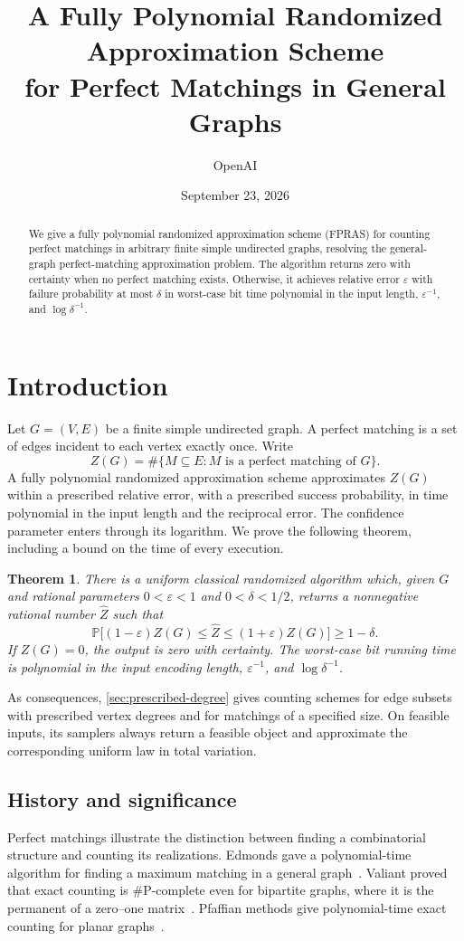 \documentclass[11pt]{article}
\title{A Fully Polynomial Randomized Approximation Scheme\\
for Perfect Matchings in General Graphs}
\author{OpenAI}
\date{September 23, 2026}
\newtheorem{theorem}{Theorem}[section]
\theoremstyle{definition}
\theoremstyle{remark}
\newcommand{\Prb}{\mathbb P}
\newcommand{\eps}{\varepsilon}
\numberwithin{equation}{section}
\begin{document}
\maketitle
\begin{abstract}
We give a fully polynomial randomized approximation scheme (FPRAS) for
counting perfect matchings in arbitrary finite simple undirected graphs,
resolving the general-graph perfect-matching approximation problem.
The algorithm returns zero with certainty when no perfect matching exists.
Otherwise, it achieves relative error $\eps$ with failure probability at
most $\delta$ in worst-case bit time polynomial in the input length,
$\eps^{-1}$, and $\log\delta^{-1}$.
\end{abstract}
\tableofcontents
\section{Introduction}
\label{sec:introduction}

Let $G=(V,E)$ be a finite simple undirected graph. A perfect matching is a
set of edges incident to each vertex exactly once. Write
\[
 Z(G)=\#\{M\subseteq E:M\text{ is a perfect matching of }G\}.
\]
A fully polynomial randomized approximation scheme approximates $Z(G)$
within a prescribed relative error, with a prescribed success probability,
in time polynomial in the input length and the reciprocal error.
The confidence parameter enters through its logarithm. We prove the
following theorem, including a bound on the time of every execution.

\begin{theorem}\label{thm:main}
There is a uniform classical randomized algorithm which, given $G$ and
rational parameters $0<\eps<1$ and $0<\delta<1/2$, returns a nonnegative
rational number $\widehat Z$ such that
\[
 \Prb\bigl[(1-\eps)Z(G)\le \widehat Z\le(1+\eps)Z(G)\bigr]
 \ge 1-\delta.
\]
If $Z(G)=0$, the output is zero with certainty. The worst-case bit running
time is polynomial in the input encoding length, $\eps^{-1}$, and
$\log\delta^{-1}$.
\end{theorem}

As consequences, \cref{sec:prescribed-degree} gives counting schemes for
edge subsets with prescribed vertex degrees and for matchings of a
specified size. On feasible inputs, its samplers always return a
feasible object and approximate the corresponding uniform law in total
variation.

\subsection{History and significance}
Perfect matchings illustrate the distinction between finding a
combinatorial structure and counting its realizations. Edmonds gave a
polynomial-time algorithm for finding a maximum matching in a general
graph~\cite{Edmonds1965}. Valiant proved that exact counting is
\#P-complete even for bipartite graphs, where it is the permanent of a
zero--one matrix~\cite{Valiant1979}. Pfaffian methods give
polynomial-time exact counting for planar graphs~\cite{Kasteleyn1963}.
\end{document}
